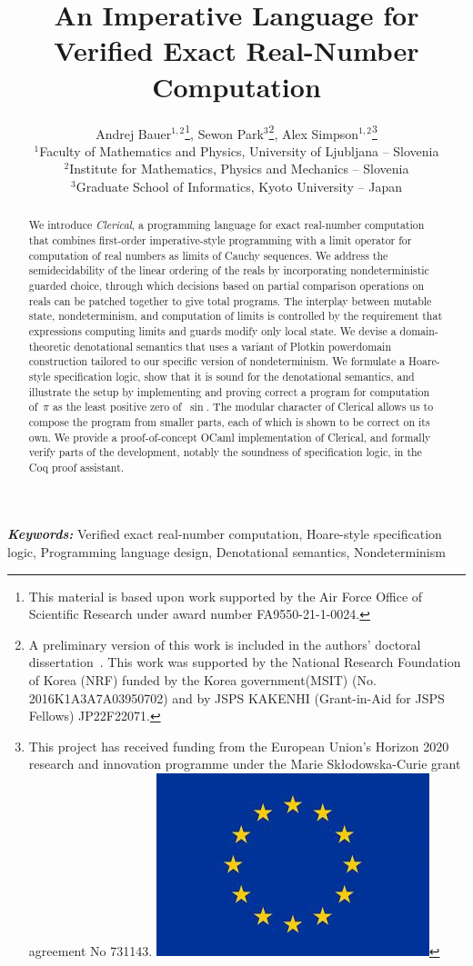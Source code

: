 \documentclass[12pt]{article}
\title{An Imperative Language for Verified Exact Real-Number Computation}
\author{
Andrej Bauer${}^{1,2}$\thanks{This material is based upon work supported by the Air Force Office of Scientific Research under award number FA9550-21-1-0024.},
Sewon Park$^3$\thanks{A preliminary version of this work is included in the authors' doctoral dissertation~\cite{sewonphd}. 
This work was supported by the National Research Foundation of Korea (NRF) funded by the Korea government(MSIT) (No. 2016K1A3A7A03950702) and by JSPS KAKENHI (Grant-in-Aid for JSPS Fellows) JP22F22071.},
Alex Simpson${}^{1,2}$\thanks{This project has received funding from the  European Union's  Horizon  2020  research  
and innovation programme under the Marie Sk{\l}odowska-Curie grant  agreement No 731143.\newline
\includegraphics[scale=0.07]{eu-flag-300x201.jpg}}\\
\small $^{1}$Faculty of Mathematics and Physics, University of Ljubljana -- Slovenia\\
\small $^{2}$Institute for Mathematics, Physics and Mechanics -- Slovenia\\
\small $^{3}$Graduate School of Informatics, Kyoto University -- Japan
} %
\date{}
\begin{document}
\maketitle

\begin{abstract}

We introduce \emph{Clerical}, a programming language for exact real-number computation that combines first-order imperative-style programming with
a limit operator for computation of real numbers as limits of Cauchy sequences.
%
We address the semidecidability of the linear ordering of the reals by incorporating nondeterministic guarded choice, through which decisions based on partial comparison operations on reals can be patched together to give total programs.
%
The interplay between mutable state, nondeterminism, and computation of limits is controlled by the requirement that expressions computing limits and guards modify only local state.
%
We devise a domain-theoretic denotational semantics that uses a variant of Plotkin powerdomain construction tailored to our specific version of nondeterminism.
%
We formulate a Hoare-style specification logic, show that it is sound for the denotational semantics,
and illustrate the setup by implementing and proving correct a program for computation of~$\pi$ as the least positive zero of~$\sin$. The modular character of Clerical allows us to compose the program from smaller parts, each of which is shown to be correct on its own.
%
We provide a proof-of-concept OCaml implementation of Clerical, and formally verify parts of the development, notably the soundness of specification logic, in the Coq proof assistant.
%
\end{abstract}

\bigskip

\noindent
\textbf{\textit{Keywords:}}
Verified exact real-number computation, Hoare-style specification logic, Programming language design, Denotational semantics, Nondeterminism

\clearpage

\tableofcontents

\newpage












\end{document}
